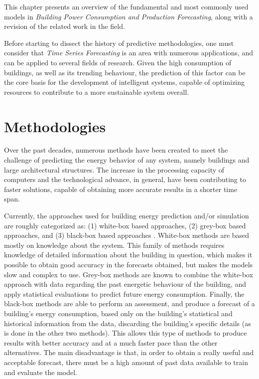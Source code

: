 \cleardoublepage
\label{chap:background}

This chapter presents an overview of the fundamental and most commonly used models in \textit{Building Power Consumption and Production Forecasting}, along with a revision of the related work in the field.

Before starting to dissect the history of predictive methodologies, one must consider that \textit{Time Series Forecasting} is an area with numerous applications, and can be applied to several fields of research. Given the high consumption of buildings, as well as its trending behaviour, the prediction of this factor can be the core basis for the development of intelligent systems, capable of optimizing resources to contribute to a more sustainable system overall.


\section{Methodologies\label{a}}

Over the past decades, numerous methods have been created to meet the challenge of predicting the energy behavior of any system, namely buildings and large architectural structures. The increase in the processing capacity of computers and the technological advance, in general, have been contributing to faster solutions, capable of obtaining more accurate results in a shorter time span.

Currently, the approaches used for building energy prediction and/or simulation are roughly categorized as: (1) white-box based approaches, (2) grey-box based approaches, and (3) black-box based approaches \cite{review2017}. White-box methods are based mostly on knowledge about the system. This family of methods requires knowledge of detailed information about the building in question, which makes it possible to obtain good accuracy in the forecasts obtained, but makes the models slow and complex to use. Grey-box methods are known to combine the white-box approach with data regarding the past energetic behaviour of the building, and apply statistical evaluations to predict future energy consumption. Finally, the black-box methods are able to perform an assessment, and produce a forecast of a building's energy consumption, based only on the building's statistical and historical information from the data, discarding the building's specific details (as is done in the other two methods). This allows this type of methods to produce results with better accuracy and at a much faster pace than the other alternatives. The main disadvantage is that, in order to obtain a really useful and acceptable forecast, there must be a high amount of past data available to train and evaluate the model.

